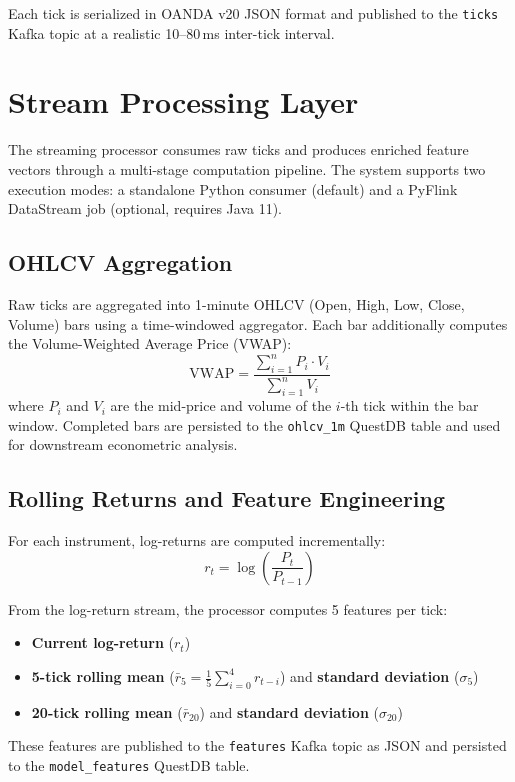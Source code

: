 \documentclass[letterpaper,11pt]{report}
\begin{document}
Each tick is serialized in OANDA v20 JSON format and published to the \texttt{ticks} Kafka topic at a realistic 10--80\,ms inter-tick interval.

\section{Stream Processing Layer}

The streaming processor consumes raw ticks and produces enriched feature vectors through a multi-stage computation pipeline. The system supports two execution modes: a standalone Python consumer (default) and a PyFlink DataStream job (optional, requires Java 11).

\subsection{OHLCV Aggregation}

Raw ticks are aggregated into 1-minute OHLCV (Open, High, Low, Close, Volume) bars using a time-windowed aggregator. Each bar additionally computes the Volume-Weighted Average Price (VWAP):
$$\text{VWAP} = \frac{\sum_{i=1}^{n} P_i \cdot V_i}{\sum_{i=1}^{n} V_i}$$
where $P_i$ and $V_i$ are the mid-price and volume of the $i$-th tick within the bar window. Completed bars are persisted to the \texttt{ohlcv\_1m} QuestDB table and used for downstream econometric analysis.

\subsection{Rolling Returns and Feature Engineering}

For each instrument, log-returns are computed incrementally:
$$r_t = \log\left(\frac{P_t}{P_{t-1}}\right)$$

From the log-return stream, the processor computes 5 features per tick:
\begin{itemize}
    \item \textbf{Current log-return} ($r_t$)
    \item \textbf{5-tick rolling mean} ($\bar{r}_5 = \frac{1}{5}\sum_{i=0}^{4} r_{t-i}$) and \textbf{standard deviation} ($\sigma_5$)
    \item \textbf{20-tick rolling mean} ($\bar{r}_{20}$) and \textbf{standard deviation} ($\sigma_{20}$)
\end{itemize}

These features are published to the \texttt{features} Kafka topic as JSON and persisted to the \texttt{model\_features} QuestDB table.
\end{document}
